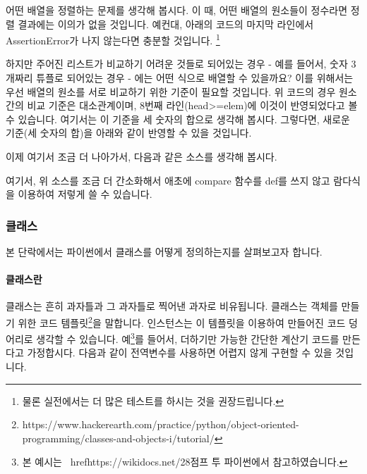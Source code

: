 \documentclass[titlepage]{report}
\begin{document}
어떤 배열을 정렬하는 문제를 생각해 봅시다. 이 때, 어떤 배열의 원소들이 정수라면 정렬 결과에는 이의가 없을 것입니다. 예컨대, 아래의 코드의 마지막 라인에서 AssertionError가 나지 않는다면 충분할 것입니다. \footnote{물론 실전에서는 더 많은 테스트를 하시는 것을 권장드립니다.}





하지만 주어진 리스트가 비교하기 어려운 것들로 되어있는 경우 - 예를 들어서, 숫자 3개짜리 튜플로 되어있는 경우 - 에는 어떤 식으로 배열할 수 있을까요? 이를 위해서는 우선 배열의 원소를 서로 비교하기 위한 기준이 필요할 것입니다. 위 코드의 경우 원소간의 비교 기준은 대소관계이며, 8번째 라인(head>=elem)에 이것이 반영되었다고 볼 수 있습니다. 여기서는 이 기준을 세 숫자의 합으로 생각해 봅시다. 그렇다면, 새로운 기준(세 숫자의 합)을 아래와 같이 반영할 수 있을 것입니다. 




이제 여기서 조금 더 나아가서, 다음과 같은 소스를 생각해 봅시다. 



여기서, 위 소스를 조금 더 간소화해서 애초에 compare 함수를 def를 쓰지 않고 람다식을 이용하여 저렇게 쓸 수 있습니다. 



\subsubsection{클래스}

본 단락에서는 파이썬에서 클래스를 어떻게 정의하는지를 살펴보고자 합니다. 

\paragraph{클래스란} 

클래스는 흔히 과자틀과 그 과자틀로 찍어낸 과자로 비유됩니다.  클래스는 객체를 만들기 위한 코드 템플릿\footnote{https://www.hackerearth.com/practice/python/object-oriented-programming/classes-and-objects-i/tutorial/}을 말합니다. 인스턴스는 이 템플릿을 이용하여 만들어진 코드 덩어리로 생각할 수 있습니다. 예\footnote{본 예시는 \ href{https://wikidocs.net/28}{점프 투 파이썬}에서 참고하였습니다.}를 들어서, 더하기만 가능한 간단한 계산기 코드를 만든다고 가정합시다. 다음과 같이 전역변수를 사용하면 어렵지 않게 구현할 수 있을 것입니다. 
\end{document}
